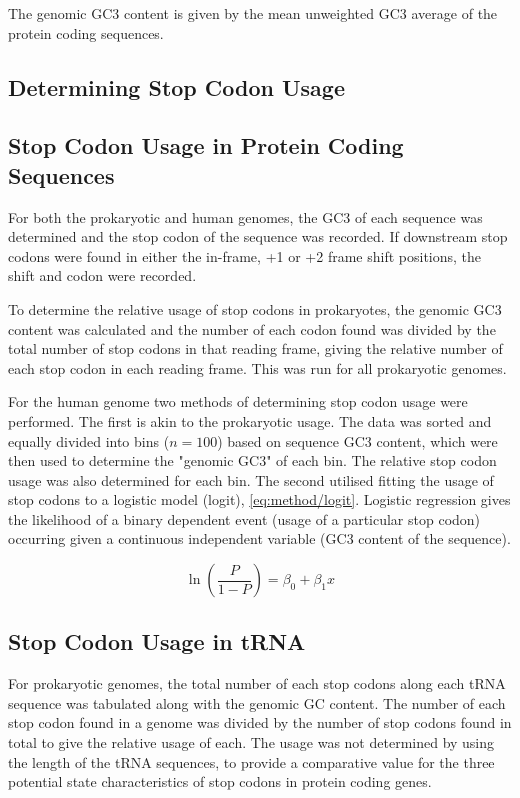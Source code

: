 \documentclass[../main.tex]{subfile}
\begin{document}
        The genomic GC3 content is given by the mean unweighted GC3 average of the protein coding sequences.
    \subsection{Determining Stop Codon Usage}
        \subsection{Stop Codon Usage in Protein Coding Sequences}
            For both the prokaryotic and human genomes, the GC3 of each sequence was determined and the stop codon of the sequence was recorded. If downstream stop codons were found in either the in-frame, +1 or +2 frame shift positions, the shift and codon were recorded.

            To determine the relative usage of stop codons in prokaryotes, the genomic GC3 content was calculated and the number of each codon found was divided by the total number of stop codons in that reading frame, giving the relative number of each stop codon in each reading frame. This was run for all prokaryotic genomes.

            For the human genome two methods of determining stop codon usage were performed.
            The first is akin to the prokaryotic usage. The data was sorted and equally divided into bins ($n=100$) based on sequence GC3 content, which were then used to determine the "genomic GC3" of each bin. The relative stop codon usage was also determined for each bin.
            The second utilised fitting the usage of stop codons to a logistic model (logit), \cref{eq:method/logit}. Logistic regression gives the likelihood of a binary dependent event (usage of a particular stop codon) occurring given a continuous independent variable (GC3 content of the sequence).

            \begin{equation}
                \ln\left(\frac{P}{1-P}\right) = \beta_0 + \beta_1 x \label{eq:method/logit}
            \end{equation}
        \subsection{Stop Codon Usage in tRNA}
            For prokaryotic genomes, the total number of each stop codons along each tRNA sequence was tabulated along with the genomic GC content. The number of each stop codon found in a genome was divided by the number of stop codons found in total to give the relative usage of each. The usage was not determined by using the length of the tRNA sequences, to provide a comparative value for the three potential state characteristics of stop codons in protein coding genes.
\end{document}
